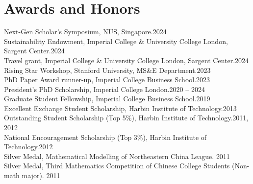 \documentclass[letterpaper,11pt]{article}
\begin{document}
\section{Awards and Honors}
\begin{itemize}[leftmargin=0.15in, label={}]
	{\item{
			{{Next-Gen Scholar's Symposium},  NUS, Singapore.}{\hfill {2024\,\,}} \\
			{{Sustainability Endowment}, Imperial College \& University College London, Sargent Center.}{\hfill {2024\,\,}} \\
			{{Travel grant}, Imperial College \& University College London,  Sargent Center.}{\hfill {2024\,\,}} \\
			{{Rising Star Workshop}, Stanford University, MS\&E Department.}{\hfill {2023\,\,}} \\
			{{PhD Paper Award runner-up}, Imperial College Business School.}{\hfill {2023\,\,}} \\
			{{President's PhD Scholarship}, Imperial College London.}{\hfill {2020 -- 2024\,\,}} \\
			{{Graduate Student Fellowship}, }{Imperial College Business School.\hfill {2019\,\,}} \\
			{{Excellent Exchange Student Scholarship}, }{Harbin Institute of Technology.\hfill {2013\,\,}} \\
			{{Outstanding Student Scholarship (Top 5\%)}, }{Harbin Institute of Technology.\hfill {2011,  2012\,\,}} \\
			{{National Encouragement Scholarship (Top 3\%)}, }{Harbin Institute of Technology.\hfill {2012\,\,}} \\
			{Silver Medal, }{Mathematical Modelling of Northeastern China League. \hfill {2011\,\,}}\\
			{Silver Medal, }{Third Mathematics Competition of Chinese College Students (Non-math major). \hfill {2011\,\,}}
	}}
\end{itemize}
\end{document}
